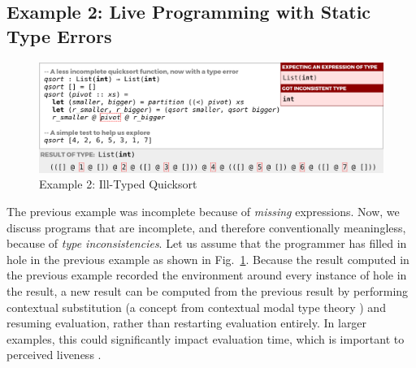 

\subsection{Example 2: Live Programming with Static Type Errors}
\label{sec:static-errors}


\begin{figure}
\centering
\includegraphics[width=\textwidth,interpolate=false,valign=t]{images/qsort-type-error-inset.png}
\vspace{2px}
\caption{Example 2: Ill-Typed Quicksort}
\label{fig:qsort-type-error}
\vspace{-4px}
\end{figure}


The previous example was incomplete 
because of \emph{missing} expressions.
%
Now, we discuss programs that are incomplete, 
and therefore conventionally meaningless, because of
\emph{type inconsistencies}. 
%
Let us 
assume that the programmer has filled in hole  in the previous example 
as shown in Fig.~\ref{fig:qsort-type-error}. 
Because the result computed in the previous example recorded the environment around every
instance of hole  in the result, a  new result can be computed from the previous result by performing 
contextual substitution (a concept from contextual modal type theory \cite{Nanevski2008})  and resuming evaluation, rather than restarting evaluation entirely.
In larger examples, this could significantly impact evaluation time, which is  
important to perceived liveness \cite{DBLP:conf/icse/Tanimoto13}. 


